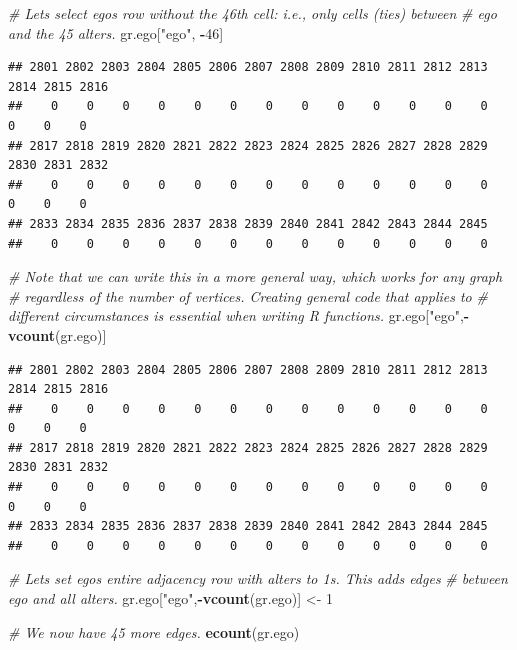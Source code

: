 \documentclass[
]{book}
\newenvironment{Shaded}{\begin{snugshade}}{\end{snugshade}}
\newcommand{\CommentTok}[1]{\textcolor[rgb]{0.56,0.35,0.01}{\textit{#1}}}
\newcommand{\DecValTok}[1]{\textcolor[rgb]{0.00,0.00,0.81}{#1}}
\newcommand{\FunctionTok}[1]{\textcolor[rgb]{0.13,0.29,0.53}{\textbf{#1}}}
\newcommand{\NormalTok}[1]{#1}
\newcommand{\OtherTok}[1]{\textcolor[rgb]{0.56,0.35,0.01}{#1}}
\newcommand{\SpecialCharTok}[1]{\textcolor[rgb]{0.81,0.36,0.00}{\textbf{#1}}}
\newcommand{\StringTok}[1]{\textcolor[rgb]{0.31,0.60,0.02}{#1}}
\begin{document}
\begin{Shaded}
\begin{Highlighting}[]
\CommentTok{\# Let\textquotesingle{}s select ego\textquotesingle{}s row without the 46th cell: i.e., only cells (ties) between}
\CommentTok{\# ego and the 45 alters. }
\NormalTok{gr.ego[}\StringTok{"ego"}\NormalTok{, }\SpecialCharTok{{-}}\DecValTok{46}\NormalTok{]}
\end{Highlighting}
\end{Shaded}

\begin{verbatim}
## 2801 2802 2803 2804 2805 2806 2807 2808 2809 2810 2811 2812 2813 2814 2815 2816 
##    0    0    0    0    0    0    0    0    0    0    0    0    0    0    0    0 
## 2817 2818 2819 2820 2821 2822 2823 2824 2825 2826 2827 2828 2829 2830 2831 2832 
##    0    0    0    0    0    0    0    0    0    0    0    0    0    0    0    0 
## 2833 2834 2835 2836 2837 2838 2839 2840 2841 2842 2843 2844 2845 
##    0    0    0    0    0    0    0    0    0    0    0    0    0
\end{verbatim}

\begin{Shaded}
\begin{Highlighting}[]
\CommentTok{\# Note that we can write this in a more general way, which works for any graph}
\CommentTok{\# regardless of the number of vertices. Creating general code that applies to}
\CommentTok{\# different circumstances is essential when writing R functions.}
\NormalTok{gr.ego[}\StringTok{"ego"}\NormalTok{,}\SpecialCharTok{{-}}\FunctionTok{vcount}\NormalTok{(gr.ego)]}
\end{Highlighting}
\end{Shaded}

\begin{verbatim}
## 2801 2802 2803 2804 2805 2806 2807 2808 2809 2810 2811 2812 2813 2814 2815 2816 
##    0    0    0    0    0    0    0    0    0    0    0    0    0    0    0    0 
## 2817 2818 2819 2820 2821 2822 2823 2824 2825 2826 2827 2828 2829 2830 2831 2832 
##    0    0    0    0    0    0    0    0    0    0    0    0    0    0    0    0 
## 2833 2834 2835 2836 2837 2838 2839 2840 2841 2842 2843 2844 2845 
##    0    0    0    0    0    0    0    0    0    0    0    0    0
\end{verbatim}

\begin{Shaded}
\begin{Highlighting}[]
\CommentTok{\# Let\textquotesingle{}s set ego\textquotesingle{}s entire adjacency row with alters to 1\textquotesingle{}s. This adds edges}
\CommentTok{\# between ego and all alters.}
\NormalTok{gr.ego[}\StringTok{"ego"}\NormalTok{,}\SpecialCharTok{{-}}\FunctionTok{vcount}\NormalTok{(gr.ego)] }\OtherTok{\textless{}{-}} \DecValTok{1}

\CommentTok{\# We now have 45 more edges.}
\FunctionTok{ecount}\NormalTok{(gr.ego)}
\end{Highlighting}
\end{Shaded}
\end{document}
